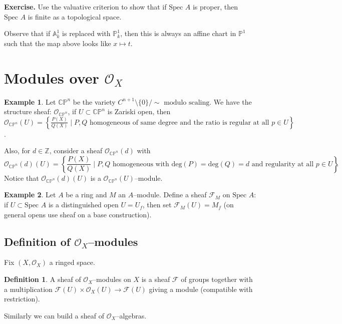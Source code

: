 \documentclass{article}
\theoremstyle{definition}
\newtheorem{example}{Example}[section]
\newtheorem{defn}{Definition}[section]
\begin{document}
\textbf{Exercise.} Use the valuative criterion to show that if $\text{Spec }A$ is proper, then $\text{Spec }A$ is finite as a topological space.
\vspace{1mm}
 
Observe that if $\mathbb{A}^1_k$ is replaced with $\mathbb{P}^1_k$, then this is always an affine chart in $\mathbb{P}^1$ such that the map above looks like $x \mapsto t$. 

\section{Modules over $\mathcal{O}_X$}
\begin{example}
    Let $\mathbb{C} \mathbb{P}^n$ be the variety $C^{n+1}\setminus \{0\}/\sim \text{ modulo scaling}$. We have the structure sheaf: $\mathcal{O}_{\mathbb{C} \mathbb{P}^n}$, if $U \subset \mathbb{C} \mathbb{P}^n$ is Zariski open, then $\mathcal{O}_{\mathbb{C} \mathbb{P}^n}(U) = \left\{\frac{P(X)}{Q(X)} \mid P,Q \text{ homogeneous of same degree and the ratio is regular at all }p \in U\right\}$.
    \vspace{1mm}
     
    Also, for $d \in \mathbb{Z}$, consider a sheaf $\mathcal{O}_{\mathbb{C} \mathbb{P}^n}(d)$ with $$\mathcal{O}_{\mathbb{C} \mathbb{P}^n}(d)(U) = \left\{\frac{P(X)}{Q(X)} \mid P,Q \text{ homogeneous with deg}(P) = \text{deg}(Q) =d  \text{ and regularity at all }p \in U\right\}.$$
    Notice that $\mathcal{O}_{\mathbb{C} \mathbb{P}^n}(d)(U)$ is a $\mathcal{O}_{\mathbb{C} \mathbb{P}^n}(U)$--module.
\end{example}
\begin{example}
    Let $A$ be a ring and $M$ an $A$--module. Define a sheaf $\mathcal{F}_M$ on $\text{Spec }A$: if $U \subset \text{Spec }A$ is a distinguished open $U= U_{f}$, then set $\mathcal{F}_M(U)=M_f$ (on general opens use sheaf on a base construction).
\end{example}

\subsection{Definition of $\mathcal{O}_X$--modules}
Fix $(X, \mathcal{O}_X)$ a ringed space.
\begin{defn}
    A sheaf of $\mathcal{O}_X$--modules on $X$ is a sheaf $\mathcal{F}$ of groups together with a multiplication $\mathcal{F}(U) \times \mathcal{O}_X(U) \to \mathcal{F}(U)$ giving a module (compatible with restriction).
\end{defn}
Similarly we can build a sheaf of $\mathcal{O}_X$--algebras.
\end{document}
